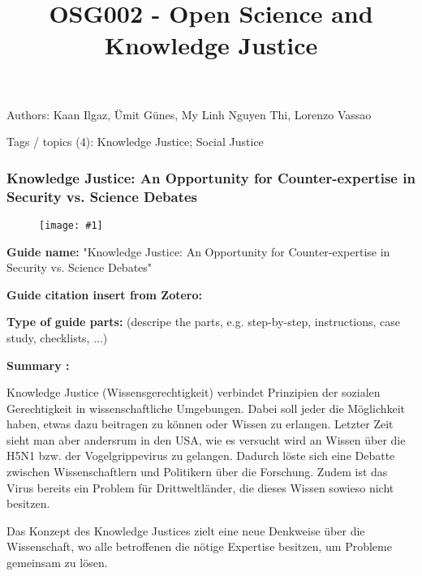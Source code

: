 \documentclass{article}
\newlength{\imgwidth}
\newcommand\scaledgraphics[2]{%
                
\settowidth{\imgwidth}{\texttt{[image: \#1]}}%
                
\setlength{\imgwidth}{\minof{\imgwidth}{#2\textwidth}}%
                
\texttt{[image: \#1]}%
                
}
\begin{document}
\title{OSG002 - Open Science and Knowledge Justice}

\maketitle


Authors: Kaan Ilgaz, Ümit Günes, My Linh Nguyen Thi, Lorenzo Vassao


Tags / topics (4): Knowledge Justice; Social Justice


\subsubsection{Knowledge Justice: An Opportunity for Counter-expertise in Security vs. Science Debates}\label{H870315}



\begin{center}
\begin{figure}
\scaledgraphics{086e7cc2-fafd-4cc2-8c8f-018ac3a9884d.png}{0.5}
\label{F24704971}
\end{figure}


\end{center}





\textbf{Guide name:} "Knowledge Justice: An Opportunity for Counter-expertise in Security vs. Science Debates"


\textbf{Guide citation insert from Zotero:} \autocite{r_egert_knowledge_2017}


\textbf{Type of guide parts:} (descripe the parts, e.g. step-by-step, instructions, case study, checklists, ...)


\textbf{Summary : } 


Knowledge Justice (Wissensgerechtigkeit) verbindet Prinzipien der sozialen Gerechtigkeit in wissenschaftliche Umgebungen. Dabei soll jeder die Möglichkeit haben, etwas dazu beitragen zu können oder Wissen zu erlangen. Letzter Zeit sieht man aber andersrum in den USA, wie es versucht wird an Wissen über die H5N1 bzw. der Vogelgrippevirus zu gelangen. Dadurch löste sich eine Debatte zwischen Wissenschaftlern und Politikern über die Forschung. Zudem ist das Virus bereits ein Problem für Drittweltländer, die dieses Wissen sowieso nicht besitzen.


Das Konzept des Knowledge Justices zielt eine neue Denkweise über die Wissenschaft, wo alle betroffenen die nötige Expertise besitzen, um Probleme gemeinsam zu lösen.
\end{document}
